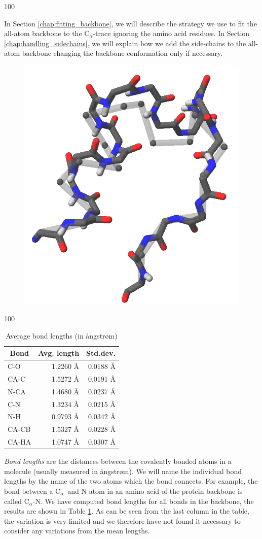 \documentclass[a0,portrait]{a0poster}
\newcommand{\Ca}{C$_{\alpha}${}}
\begin{document}
\begin{GridBlock}{0}{21}{100}
\begin{multicols}{3}
In Section \ref{chap:fitting_backbone}, we will describe the strategy we use to fit the all-atom backbone to the \Ca-trace ignoring the amino acid residues.
In Section \ref{chap:handling_sidechains}, we will explain how we add the side-chains to the all-atom backbone changing the backbone-conformation only if necessary.

\begin{figure}
\vspace{-.8cm}
\includegraphics[width=.3\columnwidth]{../rapport/figures/forside.png}
\vspace{-3.5cm}
\end{figure}

\end{multicols}
\end{GridBlock}

\begin{GridBlock}{0}{45}{100}
\begin{table}
\addtolength\leftskip{9mm}
  \begin{tabular}{lrr}
    \toprule
    \multicolumn{1}{c}{Bond} & \multicolumn{1}{c}{Avg. length} & \multicolumn{1}{c}{Std.dev.} \\ \midrule
    C-O   & 1.2260 Å & 0.0188 Å\\
    CA-C  & 1.5272 Å & 0.0191 Å\\
    N-CA  & 1.4680 Å & 0.0237 Å\\
    C-N   & 1.3234 Å & 0.0215 Å\\
    N-H   & 0.9793 Å & 0.0342 Å\\
    CA-CB & 1.5327 Å & 0.0228 Å\\
    CA-HA & 1.0747 Å & 0.0307 Å\\ \bottomrule
  \end{tabular}
  \label{tab:average_bond_lengths}
  \caption{Average bond lengths (in ångstrøm)}
\end{table}
  \textit{Bond lengths} are the distances between the covalently bonded atoms
in a molecule (usually measured in ångstrøm). We will name the
individual bond lengths by the name of the two atoms which the bond
connects. For example, the bond between a \Ca\ and N atom in an amino acid of
the protein backbone is called \Ca -N. We have computed bond lengths
for all bonds in the backbone, the results are shown in Table
\ref{tab:average_bond_lengths}. As can be seen from the last column in
the table, the variation is very limited and we therefore have not
found it necessary to consider any variations from the mean
lengths.
\end{GridBlock}
\end{document}
